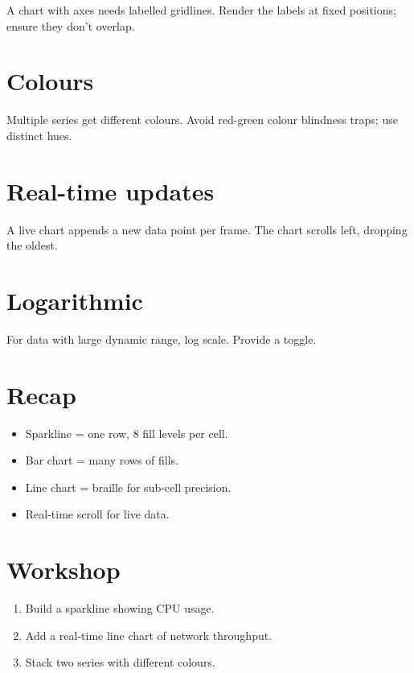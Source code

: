 A chart with axes needs labelled gridlines. Render the
labels at fixed positions; ensure they don't overlap.

\section{Colours}

Multiple series get different colours. Avoid red-green
colour blindness traps; use distinct hues.

\section{Real-time updates}

A live chart appends a new data point per frame. The
chart scrolls left, dropping the oldest.

\section{Logarithmic}

For data with large dynamic range, log scale. Provide a
toggle.

\section{Recap}

\begin{recap}
\begin{itemize}[leftmargin=*]
  \item Sparkline = one row, 8 fill levels per cell.
  \item Bar chart = many rows of fills.
  \item Line chart = braille for sub-cell precision.
  \item Real-time scroll for live data.
\end{itemize}
\end{recap}

\section*{Workshop}

\begin{enumerate}[leftmargin=*]
  \item Build a sparkline showing CPU usage.
  \item Add a real-time line chart of network throughput.
  \item Stack two series with different colours.
\end{enumerate}
